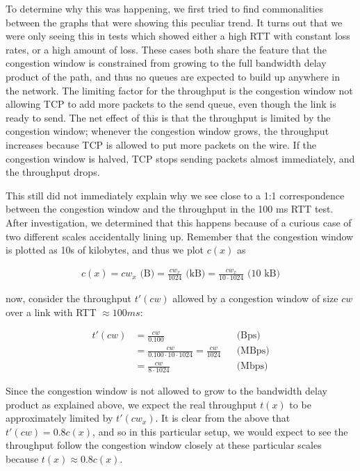 To determine why this was happening, we first tried to find commonalities
between the graphs that were showing this peculiar trend. It turns out that we
were only seeing this in tests which showed either a high RTT with constant loss rates, or a
high amount of loss. These cases both share the feature that the congestion
window is constrained from growing to the full bandwidth delay product of the
path, and thus no queues are expected to build up anywhere in the network. The
limiting factor for the throughput is the congestion window not allowing TCP to
add more packets to the send queue, even though the link is ready to send. The
net effect of this is that the throughput is limited by the congestion window;
whenever the congestion window grows, the throughput increases because TCP is
allowed to put more packets on the wire. If the congestion window is halved, TCP
stops sending packets almost immediately, and the throughput drops.

This still did not immediately explain why we see close to a 1:1 correspondence
between the congestion window and the throughput in the 100 ms RTT test. After
investigation, we determined that this happens because of a curious case of two
different scales accidentally lining up. Remember that the congestion window is
plotted as 10s of kilobytes, and thus we plot $c(x)$ as

\begin{align*}
  c(x) = cw_x \text{\ (B)}
       = \frac{cw_x}{1024} \text{\ (kB)}
       = \frac{cw_x}{10 \cdot 1024} \text{\ (10 kB)}
\end{align*}

now, consider the throughput $t'(cw)$ allowed by a congestion window of size
$cw$ over a link with RTT $\approx 100ms$:

\begin{align*}
  t'(cw) &= \frac{cw}{0.100}                       &&\text{(Bps)} \\
         &= \frac{cw}{0.100 \cdot 10 \cdot 1024}
          = \frac{cw}{1024}                        &&\text{(MBps)} \\
         &= \frac{cw}{8 \cdot 1024}                &&\text{(Mbps)}
\end{align*}

Since the congestion window is not allowed to grow to the bandwidth delay
product as explained above, we expect the real throughput $t(x)$ to be
approximately limited by $t'(cw_x)$. It is clear from the above that
$t'(cw) = 0.8 c(x)$, and so in this particular setup, we would expect to
see the throughput follow the congestion window closely at these particular
scales because $t(x) \approx 0.8 c(x)$.
